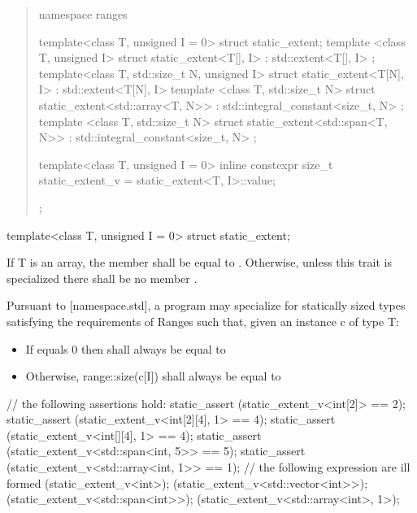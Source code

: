 \documentclass{wg21}
\begin{document}
\begin{addedblock}

\begin{quote}
\begin{codeblock}

namespace ranges {
	template<class T, unsigned I = 0>
	struct static_extent;
	template <class T, unsigned I>
	struct static_extent<T[], I> : std::extent<T[], I> {};
	template<class T, std::size_t N, unsigned I>
	struct static_extent<T[N], I> : std::extent<T[N], I> {}
	template <class T, std::size_t N>
	struct static_extent<std::array<T, N>> : std::integral_constant<size_t, N> {};
	template <class T, std::size_t N>
	struct static_extent<std::span<T, N>> : std::integral_constant<size_t, N> {};
	
	template<class T, unsigned I = 0>
	inline constexpr size_t static_extent_v = static_extent<T, I>::value;
};

\end{codeblock}
\end{quote}


\begin{itemdecl}
template<class T, unsigned I = 0>
struct static_extent;
\end{itemdecl}
\begin{itemdescr}
	\pnum
	If T is an array, the member  shall be equal to .
	Otherwise, unless this trait is specialized there shall be no member .
	
	Pursuant to [namespace.std], a program may specialize  for statically sized types satisfying the requirements of Ranges
	such that, given an instance c of type T:
		\begin{itemize}
			\item If  equals 0 then  shall always be equal to 
			\item Otherwise, range::size(c[I]) shall always be equal to 
		\end{itemize}
	\begin{example}
	\begin{codeblock}
	// the following assertions hold:
	static_assert (static_extent_v<int[2]> == 2);
	static_assert (static_extent_v<int[2][4], 1> == 4);
	static_assert (static_extent_v<int[][4], 1> == 4);
	static_assert (static_extent_v<std::span<int, 5>> == 5);
	static_assert (static_extent_v<std::array<int, 1>> == 1);
	// the following expression are ill formed
	(static_extent_v<int>);
	(static_extent_v<std::vector<int>>);
	(static_extent_v<std::span<int>>);
	(static_extent_v<std::array<int>, 1>);		
\end{codeblock}
	\end{example}
\end{itemdescr}


\end{addedblock}
\end{document}
